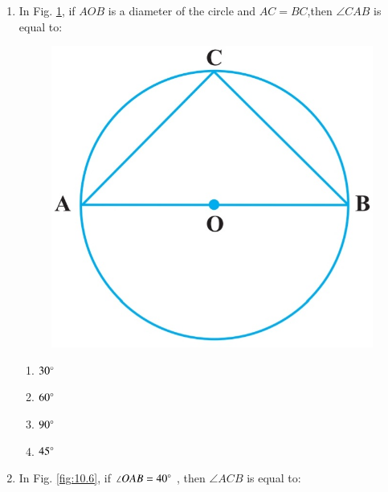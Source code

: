 \documentclass{article}
\begin{document}
\begin{enumerate}
\begin{enumerate}
\end{enumerate}
\item In Fig. \ref{fig:10.5}, if $AOB$ is a diameter of the circle and $AC = BC$,then $\angle CAB$ is equal to:
\begin{figure}[H]
\centering
\includegraphics[width=\columnwidth]{figs/10.5.jpg}
\caption{}
\label{fig:10.5}
\end{figure}
\begin{enumerate}
\item $30\degree$
\item $60\degree$
\item $90\degree$
\item $45\degree$
\end{enumerate}
\item In Fig. \ref{fig:10.6}, if $\angle OAB = 40\degree$ , then $\angle ACB$ is equal to:  
\begin{figure}[H]
\centering

\end{figure}
\end{enumerate}
\end{document}
